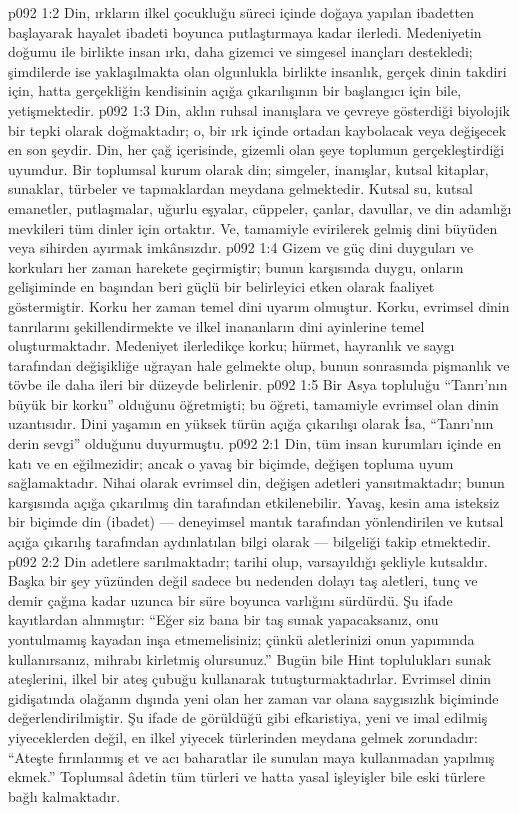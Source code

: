 \vs p092 1:2 Din, ırkların ilkel çocukluğu süreci içinde doğaya yapılan ibadetten başlayarak hayalet ibadeti boyunca putlaştırmaya kadar ilerledi. Medeniyetin doğumu ile birlikte insan ırkı, daha gizemci ve simgesel inançları destekledi; şimdilerde ise yaklaşılmakta olan olgunlukla birlikte insanlık, gerçek dinin takdiri için, hatta gerçekliğin kendisinin açığa çıkarılışının bir başlangıcı için bile, yetişmektedir.
\vs p092 1:3 Din, aklın ruhsal inanışlara ve çevreye gösterdiği biyolojik bir tepki olarak doğmaktadır; o, bir ırk içinde ortadan kaybolacak veya değişecek en son şeydir. Din, her çağ içerisinde, gizemli olan şeye toplumun gerçekleştirdiği uyumdur. Bir toplumsal kurum olarak din; simgeler, inanışlar, kutsal kitaplar, sunaklar, türbeler ve tapınaklardan meydana gelmektedir. Kutsal su, kutsal emanetler, putlaşmalar, uğurlu eşyalar, cüppeler, çanlar, davullar, ve din adamlığı mevkileri tüm dinler için ortaktır. Ve, tamamiyle evirilerek gelmiş dini büyüden veya sihirden ayırmak imkânsızdır.
\vs p092 1:4 Gizem ve güç dini duyguları ve korkuları her zaman harekete geçirmiştir; bunun karşısında duygu, onların gelişiminde en başından beri güçlü bir belirleyici etken olarak faaliyet göstermiştir. Korku her zaman temel dini uyarım olmuştur. Korku, evrimsel dinin tanrılarını şekillendirmekte ve ilkel inananların dini ayinlerine temel oluşturmaktadır. Medeniyet ilerledikçe korku; hürmet, hayranlık ve saygı tarafından değişikliğe uğrayan hale gelmekte olup, bunun sonrasında pişmanlık ve tövbe ile daha ileri bir düzeyde belirlenir.
\vs p092 1:5 Bir Asya topluluğu “Tanrı’nın büyük bir korku” olduğunu öğretmişti; bu öğreti, tamamiyle evrimsel olan dinin uzantısıdır. Dini yaşamın en yüksek türün açığa çıkarılışı olarak İsa, “Tanrı’nın derin sevgi” olduğunu duyurmuştu.
\vs p092 2:1 Din, tüm insan kurumları içinde en katı ve en eğilmezidir; ancak o yavaş bir biçimde, değişen topluma uyum sağlamaktadır. Nihai olarak evrimsel din, değişen adetleri yansıtmaktadır; bunun karşısında açığa çıkarılmış din tarafından etkilenebilir. Yavaş, kesin ama isteksiz bir biçimde din (ibadet) --- deneyimsel mantık tarafından yönlendirilen ve kutsal açığa çıkarılış tarafından aydınlatılan bilgi olarak --- bilgeliği takip etmektedir.
\vs p092 2:2 Din adetlere sarılmaktadır; tarihi olup, varsayıldığı şekliyle kutsaldır. Başka bir şey yüzünden değil sadece bu nedenden dolayı taş aletleri, tunç ve demir çağına kadar uzunca bir süre boyunca varlığını sürdürdü. Şu ifade kayıtlardan alınmıştır: “Eğer siz bana bir taş sunak yapacaksanız, onu yontulmamış kayadan inşa etmemelisiniz; çünkü aletlerinizi onun yapımında kullanırsanız, mihrabı kirletmiş olursunuz.” Bugün bile Hint toplulukları sunak ateşlerini, ilkel bir ateş çubuğu kullanarak tutuşturmaktadırlar. Evrimsel dinin gidişatında olağanın dışında yeni olan her zaman var olana saygısızlık biçiminde değerlendirilmiştir. Şu ifade de görüldüğü gibi efkaristiya, yeni ve imal edilmiş yiyeceklerden değil, en ilkel yiyecek türlerinden meydana gelmek zorundadır: “Ateşte fırınlanmış et ve acı baharatlar ile sunulan maya kullanmadan yapılmış ekmek.” Toplumsal âdetin tüm türleri ve hatta yasal işleyişler bile eski türlere bağlı kalmaktadır.
